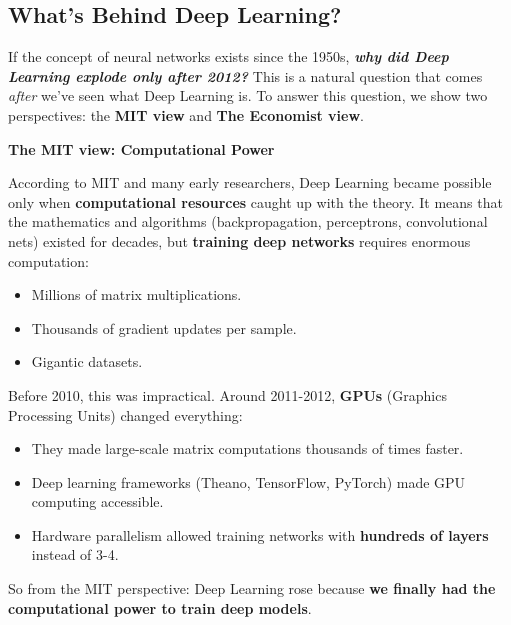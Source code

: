 \subsection{What's Behind Deep Learning?}\label{sec:whats-behind-deep-learning}

If the concept of neural networks exists since the 1950s, \textbf{\emph{why did Deep Learning explode only after 2012?}} This is a natural question that comes \emph{after} we've seen what Deep Learning is. To answer this question, we show two perspectives: the \textbf{MIT view} and \textbf{The Economist view}.

\highspace
\begin{flushleft}
    \textcolor{Green3}{ \textbf{The MIT view: Computational Power}}\label{mit-view}
\end{flushleft}
According to MIT and many early researchers, Deep Learning became possible only when \textbf{computational resources} caught up with the theory. It means that the mathematics and algorithms (backpropagation, perceptrons, convolutional nets) existed for decades, but \textbf{training deep networks} requires enormous computation:
\begin{itemize}
    \item Millions of matrix multiplications.
    \item Thousands of gradient updates per sample.
    \item Gigantic datasets.
\end{itemize}
Before 2010, this was impractical. Around 2011-2012, \textbf{GPUs} (Graphics Processing Units) changed everything:
\begin{itemize}
    \item They made large-scale matrix computations thousands of times faster.
    \item Deep learning frameworks (Theano, TensorFlow, PyTorch) made GPU computing accessible.
    \item Hardware parallelism allowed training networks with \textbf{hundreds of layers} instead of 3-4.
\end{itemize}
So from the MIT perspective: Deep Learning rose because \textbf{we finally had the computational power to train deep models}.

